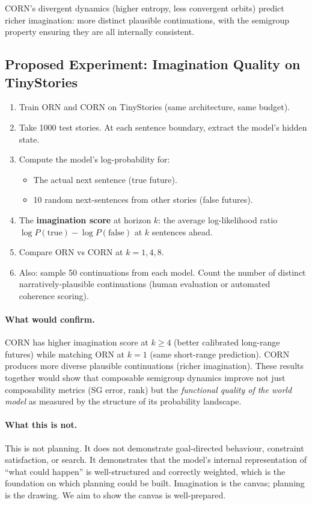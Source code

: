 \documentclass[11pt, a4paper]{article}
\theoremstyle{plain}
\theoremstyle{definition}
\theoremstyle{remark}
\begin{document}
CORN's divergent dynamics (higher entropy, less convergent orbits) predict richer imagination: more distinct plausible continuations, with the semigroup property ensuring they are all internally consistent.

\subsection{Proposed Experiment: Imagination Quality on TinyStories}

\begin{enumerate}[nosep]
    \item Train ORN and CORN on TinyStories (same architecture, same budget).
    \item Take 1000 test stories. At each sentence boundary, extract the model's hidden state.
    \item Compute the model's log-probability for:
        \begin{itemize}[nosep]
            \item The actual next sentence (true future).
            \item 10 random next-sentences from other stories (false futures).
        \end{itemize}
    \item The \textbf{imagination score} at horizon $k$: the average log-likelihood ratio $\log P(\text{true}) - \log P(\text{false})$ at $k$ sentences ahead.
    \item Compare ORN vs CORN at $k = 1, 4, 8$.
    \item Also: sample 50 continuations from each model. Count the number of distinct narratively-plausible continuations (human evaluation or automated coherence scoring).
\end{enumerate}

\paragraph{What would confirm.}
CORN has higher imagination score at $k \geq 4$ (better calibrated long-range futures) while matching ORN at $k{=}1$ (same short-range prediction).
CORN produces more diverse plausible continuations (richer imagination).
These results together would show that composable semigroup dynamics improve not just composability metrics (SG error, rank) but the \emph{functional quality of the world model} as measured by the structure of its probability landscape.

\paragraph{What this is not.}
This is not planning.
It does not demonstrate goal-directed behaviour, constraint satisfaction, or search.
It demonstrates that the model's internal representation of ``what could happen'' is well-structured and correctly weighted, which is the foundation on which planning could be built.
Imagination is the canvas; planning is the drawing.
We aim to show the canvas is well-prepared.
\end{document}
